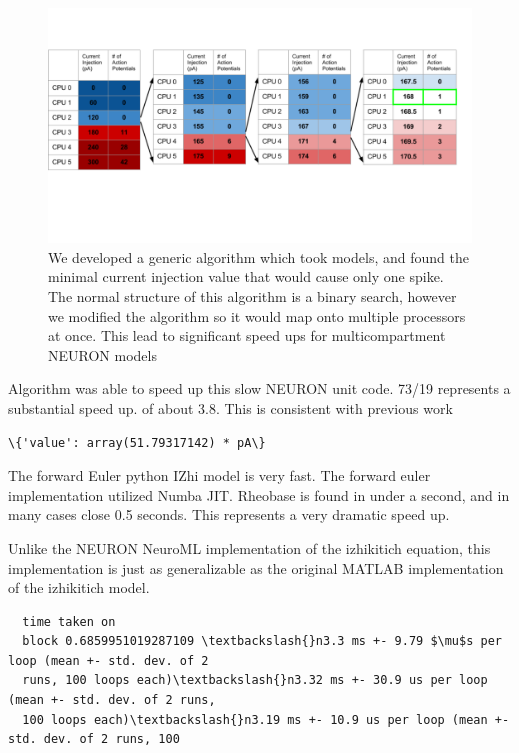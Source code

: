 \begin{figure}    
  \begin{center}
  \includegraphics[width=0.7\linewidth]{figures/rheobase_algorithm.png}
    \caption{We developed a generic algorithm which took models, and found the minimal current injection value that would cause only one spike. The normal structure of this algorithm is a binary search, however we modified the algorithm so it would map onto multiple processors at once. This lead to significant speed ups for multicompartment NEURON models}

  \end{center}
\end{figure} 

Algorithm was able to speed up this slow NEURON unit code. 73/19
represents a substantial speed up. of about 3.8. This is consistent with
previous work

\begin{verbatim}
\{'value': array(51.79317142) * pA\}
\end{verbatim}
        
    The forward Euler python IZhi model is very fast. The forward euler
implementation utilized Numba JIT. Rheobase is found in under a second,
and in many cases close 0.5 seconds. This represents a very dramatic
speed up.

Unlike the NEURON NeuroML implementation of the izhikitich equation,
this implementation is just as generalizable as the original MATLAB
implementation of the izhikitich model.


\begin{verbatim}
  time taken on
  block 0.6859951019287109 \textbackslash{}n3.3 ms +- 9.79 $\mu$s per loop (mean +- std. dev. of 2
  runs, 100 loops each)\textbackslash{}n3.32 ms +- 30.9 us per loop (mean +- std. dev. of 2 runs,
  100 loops each)\textbackslash{}n3.19 ms +- 10.9 us per loop (mean +- std. dev. of 2 runs, 100

\end{verbatim}
        

